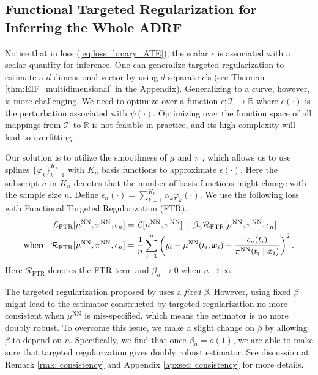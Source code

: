 \subsection{Functional Targeted Regularization for Inferring the Whole ADRF}
Notice that in loss (\ref{eq:loss_binary_ATE}), the scalar $\epsilon$ is associated with a scalar quantity for inference. One can generalize targeted regularization to estimate a $d$ dimensional vector by using $d$ separate $\epsilon$'s (see Theorem \ref{thm:EIF_multidimensional} in the Appendix). {\color{black}Generalizing to a curve, however, is more challenging.}  
We need to optimize over a function $\epsilon:\mathcal{T}\rightarrow \mathbb{R}$ where $\epsilon(\cdot)$ is the perturbation associated with $\psi(\cdot)$. Optimizing over the function space of all mappings from $\mathcal{T}$ to $\mathbb{R}$ is not feasible in practice, and its high complexity will lead to overfitting.

Our solution is to utilize the smoothness of $\mu$ and $\pi$ \citep{prichard1971assessment, schneider1993dose,threlfall1999sun}, which allows us to use splines $\{\varphi_k\}_{k=1}^{K_n}$ with $K_n$ basis functions to approximate $\epsilon(\cdot)$. Here the subscript $n$ in $K_n$ denotes that the number of basis functions might change with the sample size $n$. Define $\epsilon_{n}(\cdot)=\sum_{k=1}^{K_{n}}\alpha_{k}\varphi_{k}(\cdot)$. We use the following loss with Functional Targeted Regularization (FTR). 
\begin{align}\label{eq:targeted_reg}
\mathcal{L}_{\text{FTR}}[\mu^{\text{NN}},\pi^{\text{NN}},\epsilon_{n}] & =\mathcal{L}[\mu^{\text{NN}},\pi^{\text{NN}}]+\beta_n\mathcal{R}_{\text{FTR}}[\mu^{\text{NN}},\pi^{\text{NN}},\epsilon_{n}]\\
\nonumber
\text{where}\ \ \mathcal{R}_{\text{FTR}}[\mu^{\text{NN}},\pi^{\text{NN}},\epsilon_{n}] & =\frac{1}{n}\sum_{i=1}^{n}\left(y_{i}-\mu^{\text{NN}}(t_{i},\x_{i})-\frac{\epsilon_{n}(t_i)}{\pi^{\text{NN}}(t_{i}\mid\x_{i})}\right)^{2}.
\end{align}
Here $\mathcal{R}_{\text{FTR}}$ denotes the FTR term and $\beta_n \to 0$ when $n\to\infty$.

\begin{remark} 
The targeted regularization proposed by \citet{shi2019adapting} uses a \emph{fixed} $\beta$. However, using fixed $\beta$ might lead to the estimator constructed by targeted regularization no more consistent when $\mu^{\text{NN}}$ is mis-specified, which means the estimator is no more doubly robust. To overcome this issue, we make a slight change on $\beta$ by allowing $\beta$ to depend on $n$. Specifically, we find that once $\beta_n=o(1)$, we are able to make sure that targeted regularization gives doubly robust estimator. See discussion at Remark \ref{rmk: consistency} and Appendix \ref{apxsec: consistency} for more details.
\end{remark}

